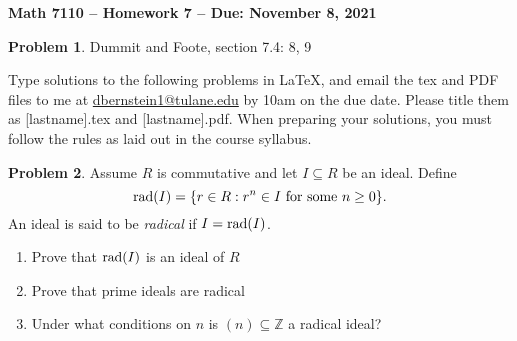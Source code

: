 \documentclass[letterpaper,11pt]{amsart}
\theoremstyle{plain}
\theoremstyle{definition}
\newtheorem{pr}{Problem}
\theoremstyle{remark}
\begin{document}
\Large

\begin{center}
{\bf Math 7110 -- Homework  7 --  Due:  November 8, 2021}
\end{center}

\normalsize


\medskip

\begin{pr}
    Dummit and Foote, section 7.4: 8, 9
\end{pr}




\bigskip

Type solutions to the following problems in \LaTeX, and email the tex and PDF files to me at \url{dbernstein1@tulane.edu} by 10am on the due date.
Please title them as [lastname].tex and [lastname].pdf.
When preparing your solutions, you must follow the rules as laid out in the course syllabus.

\vspace{.5cm}


\begin{pr}
    Assume $R$ is commutative and let $I \subseteq R$ be an ideal.
    Define
    \[
        {\rm rad}(I) = \{r \in R : r^n \in I {\rm \ for \ some \ } n \ge 0\}. 
    \]
    An ideal is said to be \emph{radical} if $I = {\rm rad}(I)$.
    \begin{enumerate}
        \item Prove that ${\rm rad}(I)$ is an ideal of $R$
        \item Prove that prime ideals are radical
        \item Under what conditions on $n$ is $(n)\subseteq \mathbb{Z}$ a radical ideal?
    \end{enumerate}
\end{pr}
\end{document}
